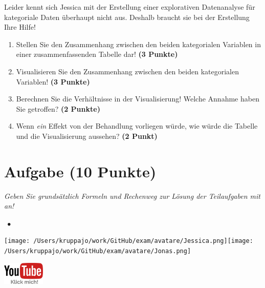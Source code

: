 \documentclass[a4paper, 9pt]{scrartcl}\usepackage[]{graphicx}\usepackage[]{xcolor}
\begin{document}
\vspace{2Ex}

Leider kennt sich Jessica mit der Erstellung einer explorativen Datenanalyse für kategoriale Daten überhaupt nicht aus. Deshalb braucht sie bei der Erstellung Ihre Hilfe!

\begin{enumerate}
\item Stellen Sie den Zusammenhang zwischen den beiden kategorialen Variablen in einer zusammenfassenden Tabelle dar! \textbf{(3 Punkte)}
\item Visualisieren Sie den Zusammenhang zwischen den beiden kategorialen Variablen! \textbf{(3 Punkte)}
\item Berechnen Sie die Verhältnisse in der Visualisierung! Welche Annahme haben Sie getroffen? \textbf{(2 Punkte)}
\item Wenn \textit{ein} Effekt von der Behandlung vorliegen würde, wie würde die Tabelle und die Visualisierung aussehen? \textbf{(2 Punkt)}
\end{enumerate} 
\clearpage

\section{Aufgabe \hfill (10 Punkte)}

\textit{Geben Sie grundsätzlich Formeln und Rechenweg zur Lösung der Teilaufgaben mit an!} \\[1Ex]
 

 
\ifcollection
\begin{flushright}
\tiny\vspace{-3Ex}
\textbf{\examinhaltstart}
\exammodulestatversuch $\;\bullet$
\exammodulebiostat
\vspace{-4Ex}
\end{flushright}
\begin{minipage}[t]{0.5\textwidth}
\texttt{[image: /Users/kruppajo/work/GitHub/exam/avatare/Jessica.png]}\hspace{-4mm}\texttt{[image: /Users/kruppajo/work/GitHub/exam/avatare/Jonas.png]}
\end{minipage}
\begin{minipage}[t]{0.5\textwidth}
\hfill
\href{https://youtu.be/Op-gjzASH9I}{\includegraphics[width = 2cm]{img/youtube}}
\end{minipage}
\fi
\end{document}
